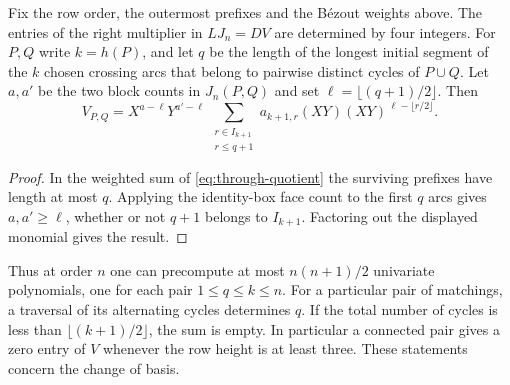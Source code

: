 \begin{corollary}\label{cor:entries}
Fix the row order, the outermost prefixes and the B\'ezout weights above.
The entries of the right multiplier in \(LJ_n=DV\) are determined
by four integers. For \(P,Q\) write \(k=h(P)\), and let \(q\) be
the length of the longest initial segment of the \(k\) chosen
crossing arcs that belong to pairwise distinct cycles of \(P\cup Q\).
Let \(a,a'\) be the two block counts in \(J_n(P,Q)\) and set
\(\ell=\lfloor(q+1)/2\rfloor\). Then
\[
 V_{P,Q}=X^{a-\ell}Y^{a'-\ell}\,
 \sum_{\substack{r\in I_{k+1}\\r\le q+1}}
   a_{k+1,r}(XY)(XY)^{\,\ell-\lfloor r/2\rfloor}.
\]
\end{corollary}
\begin{proof}
In the weighted sum of \eqref{eq:through-quotient} the surviving
prefixes have length at most \(q\). Applying the identity-box face
count to the first \(q\) arcs gives \(a,a'\ge\ell\), whether or not
\(q+1\) belongs to \(I_{k+1}\). Factoring out the displayed
monomial gives the result.
\end{proof}
Thus at order \(n\) one can precompute at most \(n(n+1)/2\) univariate
polynomials, one for each pair \(1\le q\le k\le n\).
For a particular pair of matchings, a traversal of its alternating
cycles determines \(q\). If the total number of cycles is less than
\(\lfloor(k+1)/2\rfloor\), the sum is empty. In particular a connected
pair gives a zero entry of \(V\) whenever the row height is at least
three. These statements concern the change of basis.
